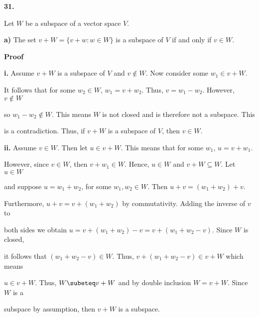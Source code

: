 \documentclass[12pt, a4paper]{article}
\begin{document}
\vspace{4mm}

\noindent\textbf{31.}\par

\vspace{4mm}

Let $W$ be a subspace of a vector space $V$.\par

\vspace{4mm}

\par\textbf{a)} The set $v+W=\{v+w\colon w\in W\}$ is a subspace of $V$ if and only if $v\in W$.\par

\vspace{4mm}

\textbf{Proof}

\vspace{2mm}\par

\hspace{4mm}\textbf{i.} Assume $v+W$ is a subspace of $V$ and $v\notin W$. Now consider some $w_1\in v+W$.\par It follows that for some $w_2\in W$, $w_1=v+w_2$. Thus, $v=w_1-w_2$. However, $v\notin W$\par so $w_1-w_2\notin W$. This means $W$ is not closed and is therefore not a subspace. This \par is a contradiction. Thus, if $v+W$ is a subspace of $V$, then $v\in W$.

\vspace{4mm}

\par\hspace{4mm}\textbf{ii.} Assume $v\in W$. Then let $u\in v+W$. This means that for some $w_1$, $u=v+w_1$.\par However, since $v\in W$, then $v+w_1\in W$. Hence, $u\in W$ and $v+W\subseteq W$. Let $u\in W$\par and suppose $u=w_1+w_2$, for some $w_1,w_2\in W$. Then $u+v=(w_1+w_2)+v$.\par Furthermore, $u+v=v+(w_1+w_2)$ by commutativity. Adding the inverse of $v$ to\par both sides we obtain $u=v+(w_1+w_2)-v=v+(w_1+w_2-v)$. Since $W$ is closed, \par it follows that $(w_1+w_2-v)\in W$. Thus, $v+(w_1+w_2-v)\in v+W$ which means\par $u\in v+W$. Thus, $W\subeteq v+W$ and by double inclusion $W=v+W$. Since $W$ is a\par subspace by assumption, then $v+W$ is a subspace. \hspace{55mm}\blacksquare
\end{document}
